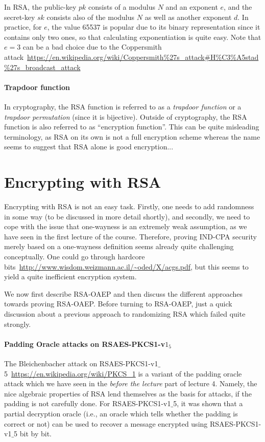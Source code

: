 \documentclass[a4paper,table,dvipsnames]{article}
\theoremstyle{definition}
\newcommand{\pcvar}[1]{\ensuremath{\mathit{#1}}}
\newcommand{\pk}{\pcvar{pk}}
\newcommand{\sk}{\pcvar{sk}}
\begin{document}
In RSA, the public-key $\pk$ consists of a modulus $N$ and an exponent $e$,
and the secret-key $\sk$ consists also of the modulus $N$ as well as 
another exponent $d$. In practice, for $e$, the value 65537 is popular due
to its binary representation since it contains only two ones, so that
calculating exponentiation is quite easy. Note that $e=3$ can be a bad
choice due to the Coppersmith attack~\url{https://en.wikipedia.org/wiki/Coppersmith%27s_attack#H%C3%A5stad%27s_broadcast_attack}

\paragraph{Trapdoor function} In cryptography, the RSA function is referred
to as a \emph{trapdoor function} or a \emph{trapdoor permutation} (since it
is bijective). Outside of cryptography, the RSA function is also referred to
as ``encryption function''. This can be quite misleading terminology, as RSA
on its own is not a full encryption scheme whereas the name seems to suggest
that RSA alone is good encryption...

\section{Encrypting with RSA}\label{sec:rsaoaep}
Encrypting with RSA is not an easy task. Firstly, one needs to add randomness
in some way (to be discussed in more detail shortly), and secondly, we need
to cope with the issue that one-wayness is an extremely weak assumption,
as we have seen in the first lecture of the course. Therefore, proving IND-CPA security merely based on a one-wayness definition seems
already quite challenging conceptually. One could go through hardcore bits~\url{http://www.wisdom.weizmann.ac.il/~oded/X/acgs.pdf},
but this seems to yield a quite inefficient encryption system.

We now first describe RSA-OAEP and then discuss the different approaches towards
proving RSA-OAEP. Before turning to RSA-OAEP, just a quick discussion about a
previous approach to randomizing RSA which failed quite strongly.

\paragraph{Padding Oracle attacks on RSAES-PKCS1-v$1_5$}
The Bleichenbacher attack on RSAES-PKCS1-v1$\_$5~\url{https://en.wikipedia.org/wiki/PKCS_1}
is a variant of the padding oracle attack which we have seen in the \emph{before the
lecture} part of lecture 4. Namely, the nice algebraic properties of RSA lend themselves
as the basis for attacks, if the
padding is not carefully done. For RSAES-PKCS1-v1$\_$5, it was shown that a partial decryption oracle (i.e., an oracle which
tells whether the padding is correct or not) can be used to recover a message encrypted 
using RSAES-PKCS1-v1$\_$5 bit by bit.
\end{document}

